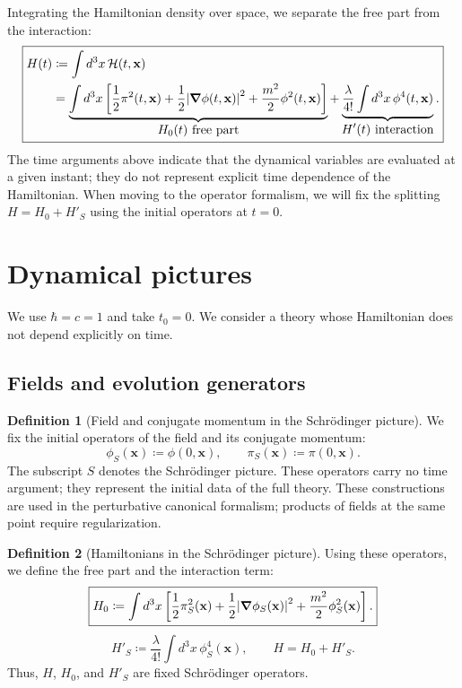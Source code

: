 \documentclass[11pt,letterpaper]{article}
\theoremstyle{definition}
\newtheorem{definicion}{Definition}
\theoremstyle{definition}
\newcommand{\eqbox}[1]{\boxed{\displaystyle #1}}
\begin{document}
Integrating the Hamiltonian density over space, we separate the free part
from the interaction:
\begin{equation}
  \boxed{\begin{aligned}
  H(t)
  &\coloneqq\int d^3x\,\mathcal{H}(t,\mathbf{x})
  \\
  &=
  \underbrace{\int d^3x\left[
    \frac{1}{2}\pi^2(t,\mathbf{x})
    +\frac{1}{2}\abs{\grad\phi(t,\mathbf{x})}^2
    +\frac{m^2}{2}\phi^2(t,\mathbf{x})
  \right]}_{\displaystyle H_0(t)\ \text{free part}}
  +
  \underbrace{\frac{\lambda}{4!}\int d^3x\,\phi^4(t,\mathbf{x})}
  _{\displaystyle H'(t)\ \text{interaction}} .
  \end{aligned}}
\end{equation}
The time arguments above indicate that the dynamical variables are
evaluated at a given instant; they do not represent explicit time
dependence of the Hamiltonian. When moving to the operator formalism,
we will fix the splitting $H=H_0+H'_S$ using the initial operators at $t=0$.

\section{Dynamical pictures}

We use $\hbar=c=1$ and take $t_0=0$. We consider a theory whose Hamiltonian
does not depend explicitly on time.

\subsection{Fields and evolution generators}

\begin{definicion}[Field and conjugate momentum in the Schrödinger picture]
We fix the initial operators of the field and its conjugate momentum:
\begin{equation}
  \eqbox{\phi_S(\mathbf{x})\coloneqq\phi(0,\mathbf{x}),
  \qquad
  \pi_S(\mathbf{x})\coloneqq\pi(0,\mathbf{x}).}
  \label{eq:phiSinitial}
\end{equation}
The subscript $S$ denotes the Schrödinger picture. These operators carry
no time argument; they represent the initial data of the full theory.
These constructions are used in the perturbative canonical formalism;
products of fields at the same point require regularization.
\end{definicion}


\begin{definicion}[Hamiltonians in the Schrödinger picture]
Using these operators, we define the free part and the interaction term:
\begin{equation}
  \eqbox{H_0\coloneqq\int d^3x\left[
    \frac{1}{2}\pi_S^2(\mathbf{x})
    +\frac{1}{2}\abs{\grad\phi_S(\mathbf{x})}^2
    +\frac{m^2}{2}\phi_S^2(\mathbf{x})\right].}
  \label{eq:H0Schrodinger}
\end{equation}
\begin{equation}
  \eqbox{H'_S\coloneqq\frac{\lambda}{4!}\int d^3x\,\phi_S^4(\mathbf{x}),
  \qquad H=H_0+H'_S.}
  \label{eq:Hprime}
\end{equation}
Thus, $H$, $H_0$, and $H'_S$ are fixed Schrödinger operators.
\end{definicion}
\end{document}
